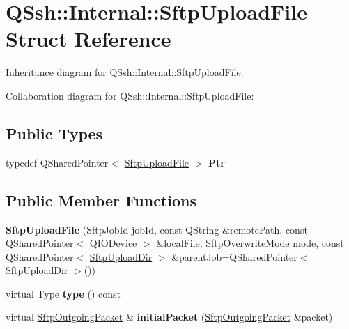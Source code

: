 \hypertarget{struct_q_ssh_1_1_internal_1_1_sftp_upload_file}{}\section{Q\+Ssh\+:\+:Internal\+:\+:Sftp\+Upload\+File Struct Reference}
\label{struct_q_ssh_1_1_internal_1_1_sftp_upload_file}


Inheritance diagram for Q\+Ssh\+:\+:Internal\+:\+:Sftp\+Upload\+File\+:


Collaboration diagram for Q\+Ssh\+:\+:Internal\+:\+:Sftp\+Upload\+File\+:
\subsection*{Public Types}
\begin{DoxyCompactItemize}
\item 
\mbox{\label{struct_q_ssh_1_1_internal_1_1_sftp_upload_file_a318e6806f38073681647c916ea1376a6}} 
typedef Q\+Shared\+Pointer$<$ \mbox{\hyperlink{struct_q_ssh_1_1_internal_1_1_sftp_upload_file}{Sftp\+Upload\+File}} $>$ {\bfseries Ptr}
\end{DoxyCompactItemize}
\subsection*{Public Member Functions}
\begin{DoxyCompactItemize}
\item 
\mbox{\label{struct_q_ssh_1_1_internal_1_1_sftp_upload_file_af11d67ecdae30e071e3acb8e3b3182fc}} 
{\bfseries Sftp\+Upload\+File} (Sftp\+Job\+Id job\+Id, const Q\+String \&remote\+Path, const Q\+Shared\+Pointer$<$ Q\+I\+O\+Device $>$ \&local\+File, Sftp\+Overwrite\+Mode mode, const Q\+Shared\+Pointer$<$ \mbox{\hyperlink{struct_q_ssh_1_1_internal_1_1_sftp_upload_dir}{Sftp\+Upload\+Dir}} $>$ \&parent\+Job=Q\+Shared\+Pointer$<$ \mbox{\hyperlink{struct_q_ssh_1_1_internal_1_1_sftp_upload_dir}{Sftp\+Upload\+Dir}} $>$())
\item 
\mbox{\label{struct_q_ssh_1_1_internal_1_1_sftp_upload_file_a06970b98023711e0630c92163aa1c8a4}} 
virtual Type {\bfseries type} () const
\item 
\mbox{\label{struct_q_ssh_1_1_internal_1_1_sftp_upload_file_a5b2ad4279e6fb37902d76b8a62301f7b}} 
virtual \mbox{\hyperlink{class_q_ssh_1_1_internal_1_1_sftp_outgoing_packet}{Sftp\+Outgoing\+Packet}} \& {\bfseries initial\+Packet} (\mbox{\hyperlink{class_q_ssh_1_1_internal_1_1_sftp_outgoing_packet}{Sftp\+Outgoing\+Packet}} \&packet)
\end{DoxyCompactItemize}
